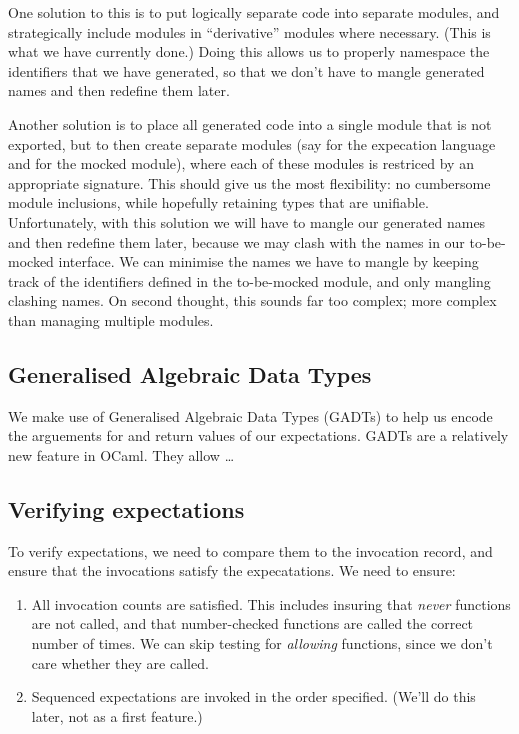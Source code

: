 One solution to this is to put logically separate code into separate
modules, and strategically include modules in ``derivative'' modules
where necessary. (This is what we have currently done.) Doing this
allows us to properly namespace the identifiers that we have
generated, so that we don't have to mangle generated names and then
redefine them later.

Another solution is to place all generated code into a single module
that is not exported, but to then create separate modules (say
 for the expecation language and  for the mocked
module), where each of these modules is restriced by an appropriate
signature. This should give us the most flexibility: no cumbersome
module inclusions, while hopefully retaining types that are
unifiable. Unfortunately, with this solution we will have to mangle
our generated names and then redefine them later, because we may clash
with the names in our to-be-mocked interface. We can minimise the
names we have to mangle by keeping track of the identifiers defined in
the to-be-mocked module, and only mangling clashing names. On second
thought, this sounds far too complex; more complex than managing
multiple modules.

\subsection{Generalised Algebraic Data Types}
\label{application:gadt}

We make use of Generalised Algebraic Data Types (GADTs) to help us
encode the arguements for and return values of our expectations. GADTs
are a relatively new feature in OCaml. They allow \dots


\subsection{Verifying expectations}

To verify expectations, we need to compare them to the invocation
record, and ensure that the invocations satisfy the expecatations. We
need to ensure:

\begin{enumerate}
\item All invocation counts are satisfied. This includes insuring that
  \textit{never} functions are not called, and that number-checked
  functions are called the correct number of times. We can skip
  testing for \textit{allowing} functions, since we don't care whether
  they are called.
\item Sequenced expectations are invoked in the order
  specified. (We'll do this later, not as a first feature.)
\end{enumerate}

